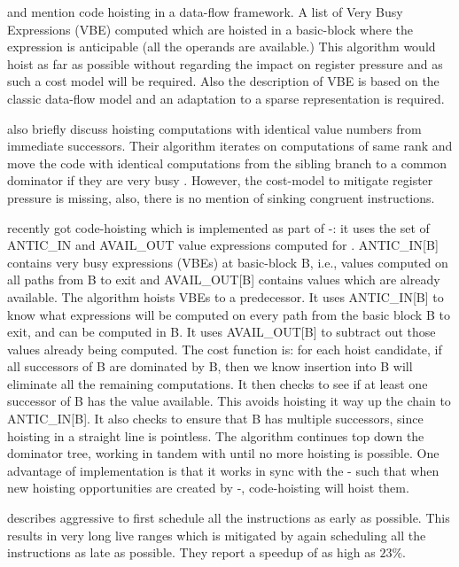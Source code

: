 \documentclass[acmlarge,review,anonymous]{acmart}\settopmatter{printfolios=true}
\begin{document}
\citet{dhamdhere1988fast} and \citet{steven1997advanced} mention
code hoisting in a data-flow framework. A list of Very Busy Expressions (VBE)
computed which are hoisted in a basic-block where the expression is
anticipable (all the operands are available.) This algorithm would hoist as far
as possible without regarding the impact on register pressure and as such a cost
model will be required.  Also the description of VBE is based on the classic
data-flow model and an adaptation to a sparse \SSA{} representation is required.

\citet{rosen1988global} also briefly discuss hoisting computations with
identical value numbers from immediate successors. Their algorithm iterates on
computations of same rank and move the code with identical computations from the
sibling branch to a common dominator if they are very busy
\cite{steven1997advanced}. However, the cost-model to mitigate register pressure
is missing, also, there is no mention of sinking congruent instructions.

\GCC{} recently got code-hoisting \cite{GCCCodeHoisting} which is implemented as
part of \GVN{}-\PRE{}: it uses the set of ANTIC\_IN and AVAIL\_OUT value
expressions computed for \PRE{}. ANTIC\_IN[B] contains very busy expressions
(VBEs) at basic-block B, i.e., values computed on all paths from B to exit and
AVAIL\_OUT[B] contains values which are already available. The algorithm hoists
VBEs to a predecessor.  It uses ANTIC\_IN[B] to know what expressions will be
computed on every path from the basic block B to exit, and can be computed in B.
It uses AVAIL\_OUT[B] to subtract out those values already being computed.  The
cost function is: for each hoist candidate, if all successors of B are dominated
by B, then we know insertion into B will eliminate all the remaining
computations.  It then checks to see if at least one successor of B has the
value available.  This avoids hoisting it way up the chain to ANTIC\_IN[B].  It
also checks to ensure that B has multiple successors, since hoisting in a
straight line is pointless.  The algorithm continues top down the dominator
tree, working in tandem with \PRE{} until no more hoisting is possible.  One
advantage of \GCC{} implementation is that it works in sync with the
\GVN{}-\PRE{} such that when new hoisting opportunities are created by
\GVN{}-\PRE{}, code-hoisting will hoist them.

\citet{click1995global} describes aggressive \gcm{} to first
schedule all the instructions as early as possible. This results in very long
live ranges which is mitigated by again scheduling all the instructions as late
as possible. They report a speedup of as high as $23\%$.
\end{document}
